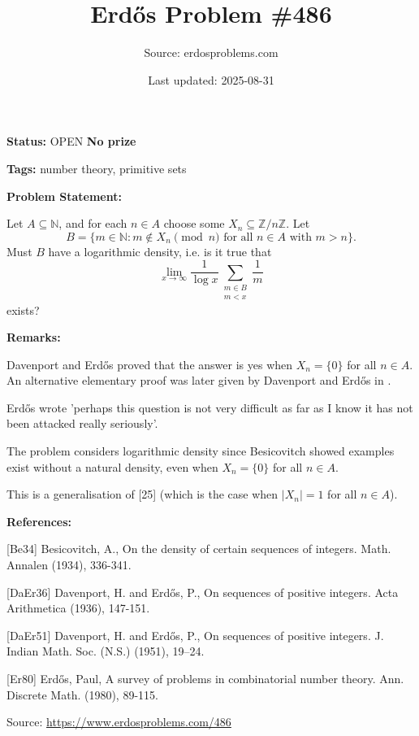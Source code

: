 \documentclass{article}
\title{Erd\H{o}s Problem \#486}
\date{Last updated: 2025-08-31}
\author{Source: erdosproblems.com}
\begin{document}
\maketitle

\noindent\textbf{Status:} OPEN \quad \textbf{No prize}

\noindent\textbf{Tags:} number theory, primitive sets

\medskip
\noindent\textbf{Problem Statement:}

Let $A\subseteq \mathbb{N}$, and for each $n\in A$ choose some $X_n\subseteq \mathbb{Z}/n\mathbb{Z}$. Let\[B = \{ m\in \mathbb{N} : m\not\in X_n\pmod{n}\textrm{ for all }n\in A\textrm{ with }m>n\}.\]Must $B$ have a logarithmic density, i.e. is it true that\[\lim_{x\to \infty} \frac{1}{\log x}\sum_{\substack{m\in B\\ m<x}}\frac{1}{m}\]exists?

\bigskip
\noindent\textbf{Remarks:}

Davenport and Erd\H{o}s \cite{DaEr36} proved that the answer is yes when $X_n=\{0\}$ for all $n\in A$. An alternative elementary proof was later given by Davenport and Erd\H{o}s in \cite{DaEr51}.

Erd\H{o}s \cite{Er80} wrote 'perhaps this question is not very difficult as far as I know it has not been attacked really seriously'.

The problem considers logarithmic density since Besicovitch \cite{Be34} showed examples exist without a natural density, even when $X_n=\{0\}$ for all $n\in A$. 

This is a generalisation of [25] (which is the case when $\lvert X_n\rvert=1$ for all $n\in A$).

\bigskip
\noindent\textbf{References:}

[Be34] Besicovitch, A., On the density of certain sequences of integers. Math. Annalen (1934), 336-341.
 
 [DaEr36] Davenport, H. and Erd\H{o}s, P., On sequences of positive integers. Acta Arithmetica (1936), 147-151.
 
 [DaEr51] Davenport, H. and Erd\H{o}s, P., On sequences of positive integers. J. Indian Math. Soc. (N.S.) (1951), 19--24.
 
 [Er80] Erd\H{o}s, Paul, A survey of problems in combinatorial number theory. Ann. Discrete Math. (1980), 89-115.

\bigskip
\noindent\small{Source: \url{https://www.erdosproblems.com/486}}
\end{document}
